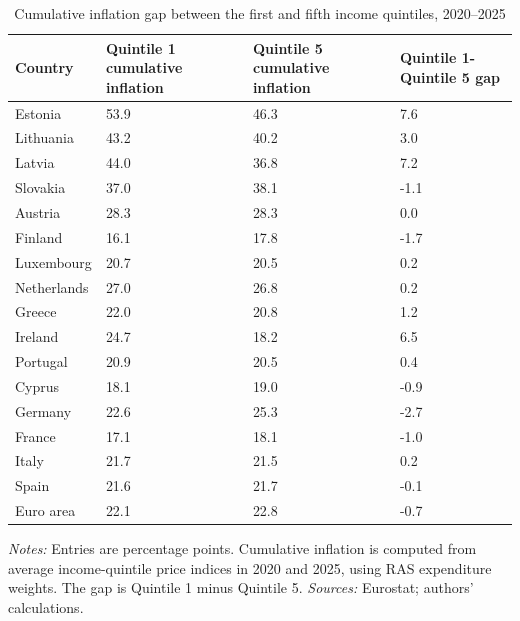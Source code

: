 \begin{table}[H]
\small
\setlength{\tabcolsep}{5pt}
\renewcommand{\arraystretch}{0.95}

\caption{\label{tab:country-heterogeneity-cumulative-gap}Cumulative inflation gap between the first and fifth income quintiles, 2020--2025}
\centering
\begin{tabular}[t]{llll}
\toprule
Country & Quintile 1 cumulative inflation & Quintile 5 cumulative inflation & Quintile 1-Quintile 5 gap\\
\midrule
Estonia & 53.9 & 46.3 & 7.6\\
Lithuania & 43.2 & 40.2 & 3.0\\
Latvia & 44.0 & 36.8 & 7.2\\
Slovakia & 37.0 & 38.1 & -1.1\\
Austria & 28.3 & 28.3 & 0.0\\
\addlinespace
Finland & 16.1 & 17.8 & -1.7\\
Luxembourg & 20.7 & 20.5 & 0.2\\
Netherlands & 27.0 & 26.8 & 0.2\\
Greece & 22.0 & 20.8 & 1.2\\
Ireland & 24.7 & 18.2 & 6.5\\
\addlinespace
Portugal & 20.9 & 20.5 & 0.4\\
Cyprus & 18.1 & 19.0 & -0.9\\
Germany & 22.6 & 25.3 & -2.7\\
France & 17.1 & 18.1 & -1.0\\
Italy & 21.7 & 21.5 & 0.2\\
\addlinespace
Spain & 21.6 & 21.7 & -0.1\\
Euro area & 22.1 & 22.8 & -0.7\\
\bottomrule
\end{tabular}
\vspace{-0.4em}
\begin{flushleft}
\footnotesize{\emph{Notes:} Entries are percentage points. Cumulative inflation is computed from average income-quintile price indices in 2020 and 2025, using RAS expenditure weights. The gap is Quintile 1 minus Quintile 5. \emph{Sources:} Eurostat; authors' calculations.}
\end{flushleft}
\end{table}

